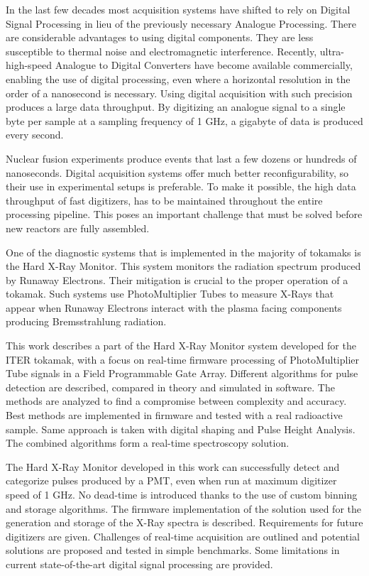 In the last few decades most acquisition systems have 
shifted to rely on Digital Signal Processing in lieu of the
previously necessary Analogue Processing. There are considerable
advantages to using digital components. They are less 
susceptible to thermal noise and electromagnetic interference.
Recently, ultra-high-speed Analogue to Digital Converters
have become available commercially, enabling the use of
digital processing, even where a horizontal resolution 
in the order of a nanosecond is necessary.
Using digital acquisition with such precision 
produces a large data throughput. By digitizing an analogue signal
to a single byte per sample at a sampling frequency of 1 GHz,
a gigabyte of data is produced every second. 


Nuclear fusion experiments produce events that last
a few dozens or hundreds of nanoseconds. Digital acquisition systems
offer much better reconfigurability, so their use in experimental 
setups is preferable. To make it possible, the high data throughput 
of fast digitizers, has to be maintained throughout the entire processing pipeline.
This poses an important challenge that must be solved before 
new reactors are fully assembled.


One of the diagnostic systems that is implemented in the majority
of tokamaks is the Hard X-Ray Monitor. This system monitors the 
radiation spectrum produced by Runaway Electrons. Their mitigation
is crucial to the proper operation of a tokamak. Such systems
use PhotoMultiplier Tubes to measure X-Rays that appear when 
Runaway Electrons interact with the plasma facing components
producing Bremsstrahlung radiation.


This work describes a part of the Hard X-Ray Monitor system developed for 
the ITER tokamak, with a focus on real-time firmware processing
of PhotoMultiplier Tube signals in a Field Programmable Gate Array.
Different algorithms for pulse detection are described, compared 
in theory and simulated in software.
The methods are analyzed to find a compromise between complexity and accuracy.
Best methods are implemented in firmware and tested with a real radioactive sample.
Same approach is taken with digital shaping and Pulse Height Analysis.
The combined algorithms form a real-time spectroscopy solution.


The Hard X-Ray Monitor developed in this work can successfully 
detect and categorize pulses produced by a PMT, even when 
run at maximum digitizer speed of 1 GHz. No dead-time is 
introduced thanks to the use of custom binning and storage algorithms.
The firmware implementation of the solution used for the generation and storage of
the X-Ray spectra is described. Requirements for future digitizers are given.
Challenges of real-time acquisition are outlined and potential solutions
are proposed and tested in simple benchmarks. Some limitations in
current state-of-the-art digital signal processing are provided.

